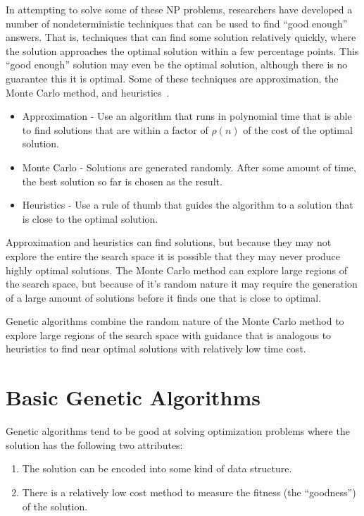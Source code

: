 In attempting to solve some of these NP problems, researchers have developed a
number of nondeterministic techniques that can be used to find ``good enough''
answers. That is, techniques that can find some solution relatively quickly,
where the solution approaches the optimal solution within a few percentage
points. This ``good enough'' solution may even be the optimal solution, although
there is no guarantee this it is optimal. Some of these techniques are
approximation, the Monte Carlo method, and
heuristics~\cite{Cormen:2009:IAT:1614191}.

\begin{itemize}
  \item {Approximation - Use an algorithm that runs in polynomial time that is
  able to find solutions that are within a factor of \(\rho (n)\) of the cost of
  the optimal solution.}
  \item {Monte Carlo - Solutions are generated randomly. After some amount of
  time, the best solution so far is chosen as the result.}
  \item {Heuristics - Use a rule of thumb that guides the algorithm to a
  solution that is close to the optimal solution.}
\end{itemize}

Approximation and heuristics can find solutions, but because they may not
explore the entire the search space it is possible that they may never produce
highly optimal solutions. The Monte Carlo method can explore large regions of
the search space, but because of it's random nature it may require the
generation of a large amount of solutions before it finds one that is close to
optimal.

Genetic algorithms combine the random nature of the Monte Carlo method to
explore large regions of the search space with guidance that is analogous to
heuristics to find near optimal solutions with relatively low time cost.

\section{Basic Genetic Algorithms}

Genetic algorithms tend to be good at solving optimization problems where the
solution has the following two attributes:

\begin{enumerate}
  \item {The solution can be encoded into some kind of data structure.}
  \item {There is a relatively low cost method to measure the fitness (the
  ``goodness'') of the solution.}
\end{enumerate}

